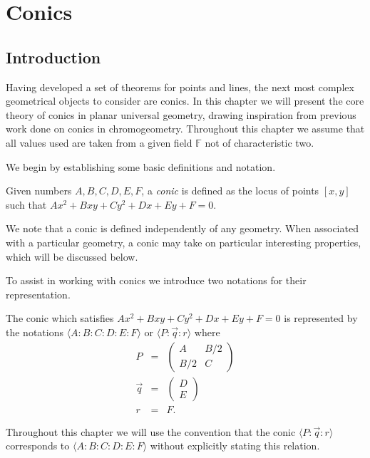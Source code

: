 \chapter{Conics}\label{chap:conics}

\section{Introduction}

Having developed a set of theorems for points and lines, the next most complex geometrical objects to consider are conics.
In this chapter we will present the core theory of conics in planar universal geometry, drawing inspiration from previous work done on conics in chromogeometry\cite{wildberger:rel-conics}.
Throughout this chapter we assume that all values used are taken from a given field $\mathbb{F}$ not of characteristic two.

We begin by establishing some basic definitions and notation.

\begin{definition} Given numbers $A, B, C, D, E, F$, a \emph{conic} is defined as the locus of points $[x,y]$ such that $Ax^2 + Bxy + Cy^2 + Dx + Ey + F = 0$.
\end{definition}

We note that a conic is defined independently of any geometry.
When associated with a particular geometry, a conic may take on particular interesting properties, which will be discussed below.

To assist in working with conics we introduce two notations for their representation.

\begin{definition} The conic which satisfies $Ax^2 + Bxy + Cy^2 + Dx + Ey + F = 0$ is represented by the notations $\langle A\!:\!B\!:\!C\!:\!D\!:\!E\!:\!F \rangle$ or $\langle P\!:\!\vec{q}\!:\!r \rangle$ where
\begin{eqnarray}
P & = & \begin{pmatrix}A & B/2 \\ B/2 & C  \end{pmatrix} \nonumber\\
\vec{q} & = & \begin{pmatrix} D \\ E  \end{pmatrix}\nonumber\\
r & = & F.\nonumber
\end{eqnarray}
\end{definition}
Throughout this chapter we will use the convention that the conic $\langle P\!:\!\vec{q}\!:\!r \rangle$ corresponds to $\langle A\!:\!B\!:\!C\!:\!D\!:\!E\!:\!F \rangle$ without explicitly stating this relation.

